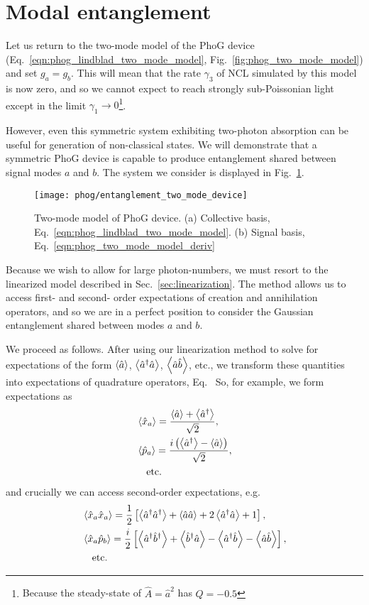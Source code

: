 \section{Modal entanglement}\label{sec:phog_entanglement}
Let us return to the two-mode model of the PhoG device (Eq.~\ref{eqn:phog_lindblad_two_mode_model}, Fig.~\ref{fig:phog_two_mode_model}) and set $g_a = g_b$. This will mean that the rate $\gamma_3$ of NCL simulated by this model is now zero, and so we cannot expect to reach strongly sub-Poissonian light except in the limit $\gamma_1 \rightarrow 0$\footnote{Because the steady-state of $\hat{A} = \hat{a}^2$ has $Q = -0.5$}.

However, even this symmetric system exhibiting two-photon absorption can be useful for generation of non-classical states. We will demonstrate that a symmetric PhoG device is capable to produce entanglement shared between signal modes $a$ and $b$. The system we consider is displayed in Fig.~\ref{fig:phog_entanglement_two_mode_device}.

\begin{figure}[htp]
\centering
\texttt{[image: phog/entanglement\_two\_mode\_device]}
\caption{\label{fig:phog_entanglement_two_mode_device} Two-mode model of PhoG device. (a) Collective basis, Eq.~\ref{eqn:phog_lindblad_two_mode_model}. (b) Signal basis, Eq.~\ref{eqn:phog_two_mode_model_deriv}}
\end{figure}

Because we wish to allow for large photon-numbers, we must resort to the linearized model described in Sec.~\ref{sec:linearization}. The method allows us to access first- and second- order expectations of creation and annihilation operators, and so we are in a perfect position to consider the Gaussian entanglement shared between modes $a$ and $b$. 

We proceed as follows. After using our linearization method to solve for expectations of the form $\ev{\hat{a}}$, $\ev{\hat{a}^\dagger \hat{a}}$, $\ev{\hat{a}\hat{b}}$, etc., we transform these quantities into expectations of quadrature operators, Eq.~ %
So, for example, we form expectations as 
\begin{align}
&\ev{\hat{x}_a} = \frac{\ev{\hat{a}} + \ev{\hat{a}^\dagger}}{\sqrt{2}}, \notag \\
%
&\ev{\hat{p}_a} = \frac{i \left(\ev{\hat{a}^\dagger} - \ev{\hat{a}}\right)}{\sqrt{2}}, \notag \\
%
&\qq{etc.} \notag
\end{align}
and crucially we can access second-order expectations, e.g. 
\begin{align}
&\ev{\hat{x}_a \hat{x}_a} = \frac{1}{2}\left[\ev{\hat{a}^\dagger \hat{a}^\dagger} + \ev{\hat{a} \hat{a}} + 2 \ev{\hat{a}^\dagger \hat{a}} + 1\right], \notag \\
%
&\ev{\hat{x}_a \hat{p}_b} = \frac{i}{2}\left[\ev{\hat{a}^\dagger \hat{b}^\dagger} + \ev{\hat{b}^\dagger \hat{a}} - \ev{\hat{a}^\dagger \hat{b}} - \ev{\hat{a} \hat{b}} \right], \notag \\
%
&\qq{etc.} \notag
\end{align}

